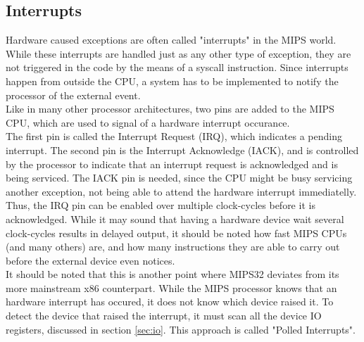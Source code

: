 \subsection{Interrupts}
\label{sec:exceptions_interrupts}
Hardware caused exceptions are often called "interrupts" in the MIPS world.
While these interrupts are handled just as any other type of exception, they
are not triggered in the code by the means of a syscall instruction. Since
interrupts happen from outside the CPU, a system has to be implemented to notify
the processor of the external event.\\
Like in many other processor architectures, two pins are added to the MIPS CPU,
which are used to signal of a hardware interrupt occurance\cite{cs_pitt:exceptions}.\\
The first pin is called the Interrupt Request (IRQ), which indicates a
pending interrupt. The second pin is the Interrupt Acknowledge (IACK), and is
controlled by the processor to indicate that an interrupt request is acknowledged
and is being serviced. The IACK pin is needed, since the CPU might be busy servicing
another exception, not being able to attend the hardware interrupt immediatelly.
Thus, the IRQ pin can be enabled over multiple clock-cycles before it is
acknowledged\cite{cs_pitt:exceptions}. While it may sound that having a hardware
device wait several clock-cycles results in delayed output, it should be noted
how fast MIPS CPUs (and many others) are, and how many instructions they are
able to carry out before the external device even notices.\\
It should be noted that this is another point where MIPS32 deviates from its
more mainstream x86 counterpart. While the MIPS processor knows that an hardware
interrupt has occured, it does not know which device raised it. To detect the
device that raised the interrupt, it must scan all the device IO registers,
discussed in section \ref{sec:io}. This approach is called "Polled Interrupts".

